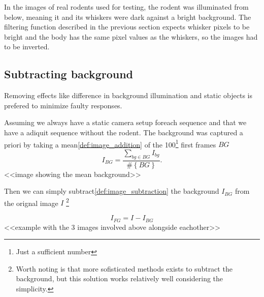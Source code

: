 In the images of real rodents used for testing, the rodent was
illuminated from below, meaning it and its whiskers were dark against
a bright background. The filtering function described in the previous
section expects whisker pixels to be bright and the body has the same 
pixel values as the whiskers, so the images had to be inverted.

\subsection{Subtracting background}
    Removing effects like difference in background illumination 
    and static objects is prefered to minimize faulty responses. 

    Assuming we always have a static camera setup foreach sequence and 
    that we have a adiquit sequence without the rodent.
    The background was captured a priori by taking a mean\ref{def:image_addition} 
    of the 100\footnote{Just a sufficient number} first frames $BG$ 
    \begin{equation}
        I_{BG} = \frac{\sum\limits_{bg\in BG}{I_{bg}}}{\#\left\{BG\right\}}.
    \end{equation}
    <<image showing the mean background>>

    Then we can simply subtract\ref{def:image_subtraction} the background $I_{BG}$ 
    from the orignal image $I$
    \footnote{
    Worth noting is that more sofisticated methods exists to subtract the background, 
    but this solution works relatively well considering the simplicity.
    }
   
    \begin{equation}
        I_{FG} = I - I_{BG}
    \end{equation}
    <<example with the 3 images involved above alongside eachother>>


